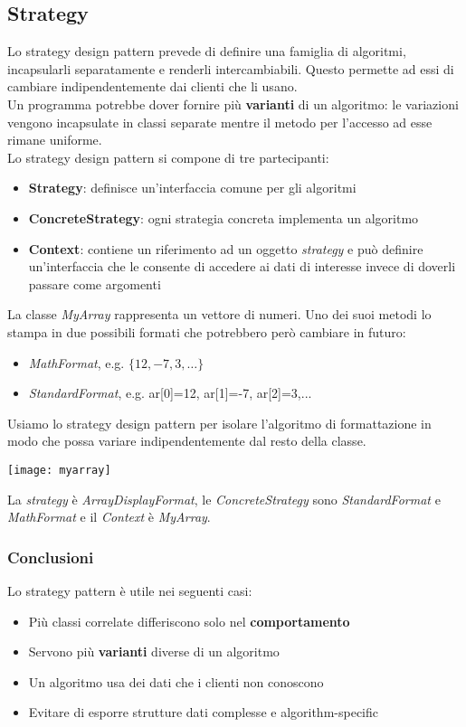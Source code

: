 \subsection{Strategy}
Lo strategy design pattern prevede di definire una famiglia di algoritmi, incapsularli separatamente e renderli intercambiabili. Questo permette ad essi di cambiare indipendentemente dai clienti che li usano.\\
Un programma potrebbe dover fornire più \textbf{varianti} di un algoritmo: le variazioni vengono incapsulate in classi separate mentre il metodo per l'accesso ad esse rimane uniforme.\\
Lo strategy design pattern si compone di tre partecipanti:
\begin{itemize}
	\item \textbf{Strategy}: definisce un'interfaccia comune per gli algoritmi
	\item \textbf{ConcreteStrategy}: ogni strategia concreta implementa un algoritmo
	\item \textbf{Context}: contiene un riferimento ad un oggetto \textit{strategy} e può definire un'interfaccia che le consente di accedere ai dati di interesse invece di doverli passare come argomenti
\end{itemize}

\begin{example}[MyArray]
	La classe \textit{MyArray} rappresenta un vettore di numeri. Uno dei suoi metodi lo stampa in due possibili formati che potrebbero però cambiare in futuro:
	\begin{itemize}
		\item \textit{MathFormat}, e.g. $\{12,-7,3,\ldots\}$
		\item \textit{StandardFormat}, e.g. ar[0]=12, ar[1]=-7, ar[2]=3,...
	\end{itemize}
	Usiamo lo strategy design pattern per isolare l'algoritmo di formattazione in modo che possa variare indipendentemente dal resto della classe.
	\begin{center}
		\texttt{[image: myarray]}
	\end{center}
	La \textit{strategy} è \textit{ArrayDisplayFormat}, le \textit{ConcreteStrategy} sono \textit{StandardFormat} e \textit{MathFormat} e il \textit{Context} è \textit{MyArray}.
\end{example}

\subsubsection{Conclusioni}
Lo strategy pattern è utile nei seguenti casi:
\begin{itemize}
	\item Più classi correlate differiscono solo nel \textbf{comportamento}
	\item Servono più \textbf{varianti} diverse di un algoritmo
	\item Un algoritmo usa dei dati che i clienti non conoscono
	\item Evitare di esporre strutture dati complesse e algorithm-specific
\end{itemize}

